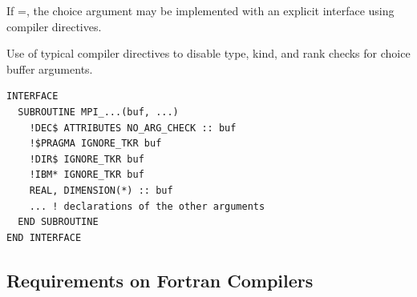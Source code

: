 \begin{implementors}
If =,
the choice argument may be implemented with an
explicit interface using compiler directives.
\begin{example}
Use of typical compiler directives to disable type, kind, and rank checks for choice buffer arguments.
\begin{lstlisting}[language={[MPI]Fortran}]
INTERFACE
  SUBROUTINE MPI_...(buf, ...)
    !DEC$ ATTRIBUTES NO_ARG_CHECK :: buf
    !$PRAGMA IGNORE_TKR buf
    !DIR$ IGNORE_TKR buf
    !IBM* IGNORE_TKR buf
    REAL, DIMENSION(*) :: buf
    ... ! declarations of the other arguments
  END SUBROUTINE
END INTERFACE
\end{lstlisting}
\end{example}
\end{implementors}

\subsection{Requirements on Fortran Compilers}
\label{sec:f90:requirements}

